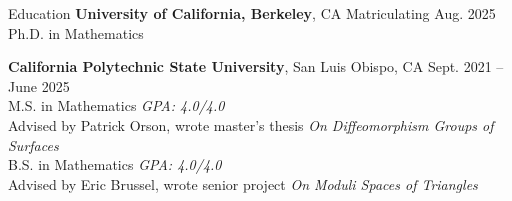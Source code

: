 \documentclass[
	11pt, %
]{cv} %
\begin{document}
\begin{rSection}{Education}
	\textbf{University of California, Berkeley}, CA \hfill Matriculating Aug. 2025 \\
	Ph.D. in Mathematics

	\textbf{California Polytechnic State University}, San Luis Obispo, CA \hfill Sept. 2021 -- June 2025 \\
	M.S. in  Mathematics \hfill \textit{GPA: 4.0/4.0} \\
	\-\hspace{1cm}Advised by Patrick Orson, wrote master's thesis \textit{On Diffeomorphism Groups of Surfaces}\\
	B.S. in Mathematics \hfill \textit{GPA: 4.0/4.0} \\
	\-\hspace{1cm}Advised by Eric Brussel, wrote senior project \textit{On Moduli Spaces of Triangles}
\end{rSection}
\end{document}
